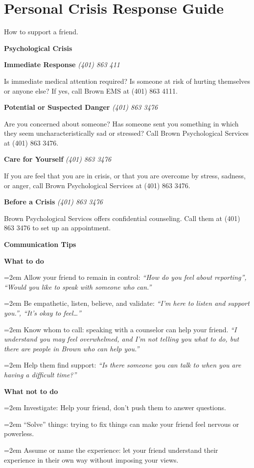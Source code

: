 \documentclass[letterpaper,10pt]{report}
\newcommand{\tosay}[1]{\textit{#1}}
\newcommand{\situation}[4]{

\parbox{\columnwidth}{
\textbf{#1} \hspace{\fill} \textit{#2} 


#3 \ifthenelse{\isempty{#4}}{}{\\ \tosay{#4}}
\vspace{6pt}}}
\newcommand{\tip}[1]{

\hangindent=2em\hangafter=1 
#1}
\newcommand{\type}[1]{\parbox{\columnwidth}{\large\textbf{#1}}}
\begin{document}

\setlength{\columnsep}{0.5in}
\section*{\centering Personal Crisis Response Guide} 
\begin{center}How to support a friend.\end{center} 
\begin{multicols}{2}
\begin{spacing}{1.15}
\type{Psychological Crisis}

\situation{Immediate Response}{(401) 863 411}{Is immediate medical attention required? Is someone at risk of hurting themselves or anyone else? If yes, call Brown EMS at (401) 863 4111.}{}

\situation{Potential or Suspected Danger}{(401) 863 3476} {Are you concerned about someone? Has someone sent you something in which they seem uncharacteristically sad or stressed? Call Brown Psychological Services at (401) 863 3476.}{}

\situation{Care for Yourself}{(401) 863 3476} { If you are feel that you are in crisis, or that you are overcome by stress, sadness, or anger, call Brown Psychological Services at (401) 863 3476.}{}

\situation{Before a Crisis}{(401) 863 3476} {Brown Psychological Services offers confidential counseling. Call them at (401) 863 3476 to set up an appointment.}{}

\type{Communication Tips}

\situation {What to do} {} {
  \tip{Allow your friend to remain in control: \tosay{``How do you feel about reporting'', ``Would you like to speak with someone who can.''}}
  \tip{Be empathetic, listen, believe, and validate: \tosay{``I'm here to listen and support you.'', ``It's okay to feel\ldots''}}
  \tip{Know whom to call: speaking with a counselor can help your friend. \tosay{``I understand you may feel overwhelmed, and I'm not telling you what to do, but there are people in Brown who can help you.''}}
  \tip{Help them find support: \tosay{``Is there someone you can talk to when you are having a difficult time?''}}
}{}


\situation {What not to do}{}{
  \tip{Investigate: Help your friend, don't push them to answer questions.}
  \tip{``Solve'' things: trying to fix things can make your friend feel nervous or powerless.}
  \tip{Assume or name the experience: let your friend understand their experience in their own way without imposing your views.}
}{}


\end{spacing}
\end{multicols}
\end{document}
